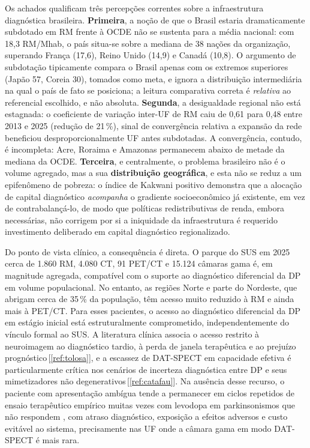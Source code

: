 \documentclass[12pt,a4paper,oneside]{article}
\begin{document}
Os achados qualificam três percepções correntes sobre a infraestrutura
diagnóstica brasileira. \textbf{Primeira}, a noção de que o Brasil
estaria dramaticamente subdotado em RM frente à OCDE não se sustenta
para a média nacional: com 18,3 RM/Mhab, o país situa-se sobre a
mediana de 38 nações da organização, superando França (17,6), Reino
Unido (14,9) e Canadá (10,8). O argumento de subdotação tipicamente
compara o Brasil apenas com os extremos superiores (Japão 57, Coreia
30), tomados como meta, e ignora a distribuição intermediária na qual o
país de fato se posiciona; a leitura comparativa correta é
\textit{relativa} ao referencial escolhido, e não absoluta.
\textbf{Segunda}, a desigualdade regional não está estagnada: o
coeficiente de variação inter-UF de RM caiu de 0,61 para 0,48 entre
2013 e 2025 (redução de 21\,\%), sinal de convergência relativa
\textemdash{} a expansão da rede beneficiou desproporcionalmente UF
antes subdotadas. A convergência, contudo, é incompleta: Acre, Roraima
e Amazonas permanecem abaixo de metade da mediana da OCDE.
\textbf{Terceira}, e centralmente, o problema brasileiro não é o
volume agregado, mas a sua \textbf{distribuição geográfica}, e esta não
se reduz a um epifenômeno de pobreza: o índice de Kakwani positivo
demonstra que a alocação de capital diagnóstico \textit{acompanha} o
gradiente socioeconômico já existente, em vez de contrabalançá-lo, de
modo que políticas redistributivas de renda, embora necessárias, não
corrigem por si a iniquidade da infraestrutura \textemdash{} é
requerido investimento deliberado em capital diagnóstico regionalizado.

Do ponto de vista clínico, a consequência é direta. O parque do SUS em
2025 \textemdash{} cerca de 1.860 RM, 4.080 CT, 91 PET/CT e 15.124
câmaras gama \textemdash{} é, em magnitude agregada, compatível com o
suporte ao diagnóstico diferencial da DP em volume populacional. No
entanto, as regiões Norte e parte do Nordeste, que abrigam cerca de
35\,\% da população, têm acesso muito reduzido à RM e ainda mais à
PET/CT. Para esses pacientes, o acesso ao diagnóstico diferencial da
DP em estágio inicial está estruturalmente comprometido,
independentemente do vínculo formal ao SUS. A literatura clínica
associa o acesso restrito à neuroimagem ao diagnóstico tardio, à perda
de janela terapêutica e ao prejuízo prognóstico\,[\ref{ref:tolosa}], e
a escassez de DAT-SPECT em capacidade efetiva é particularmente crítica
nos cenários de incerteza diagnóstica entre DP e seus mimetizadores
não degenerativos\,[\ref{ref:catafau}]. Na ausência desse recurso, o
paciente com apresentação ambígua tende a permanecer em ciclos
repetidos de ensaio terapêutico empírico \textemdash{} muitas vezes com
levodopa em parkinsonismos que não respondem \textemdash{}, com atraso
diagnóstico, exposição a efeitos adversos e custo evitável ao sistema,
precisamente nas UF onde a câmara gama em modo DAT-SPECT é mais rara.
\end{document}
